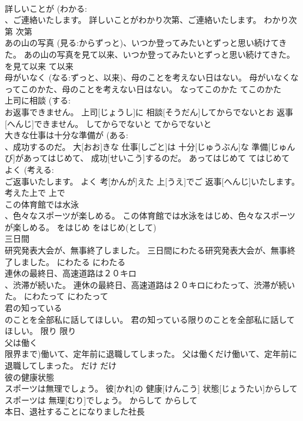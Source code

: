 \documentclass[8pt]{extreport}
\begin{document}
\begin{CJK}{UTF8}{min}
\\	詳しいことが (わかる: 
\\	、ご連絡いたします。	詳しいことがわかり次第、ご連絡いたします。	わかり次第	次第	
\\	あの山の写真 (見る:からずっと)、いつか登ってみたいとずっと思い続けてきた。	あの山の写真を見て以来、いつか登ってみたいとずっと思い続けてきた。	を見て以来	て以来	
\\	母がいなく (なる:ずっと、以来)、母のことを考えない日はない。	母がいなくなってこのかた、母のことを考えない日はない。	なってこのかた	てこのかた	
\\	上司に相談 (する: 
\\	お返事できません。	上司[じょうし]に 相談[そうだん]してからでないとお 返事[へんじ]できません。	してからでないと	てからでないと	
\\	大きな仕事は十分な準備が (ある: 
\\	、成功するのだ。	大[おお]きな 仕事[しごと]は 十分[じゅうぶん]な 準備[じゅんび]があってはじめて、 成功[せいこう]するのだ。	あってはじめて	てはじめて	
\\	よく (考える: 
\\	ご返事いたします。	よく 考[かんが]えた 上[うえ]でご 返事[へんじ]いたします。	考えた上で	上で	
\\	この体育館では水泳 
\\	、色々なスポーツが楽しめる。	この体育館では水泳をはじめ、色々なスポーツが楽しめる。	をはじめ	をはじめ(として)	
\\	三日間 
\\	研究発表大会が、無事終了しました。	三日間にわたる研究発表大会が、無事終了しました。	にわたる	にわたる	
\\	連休の最終日、高速道路は２０キロ 
\\	、渋滞が続いた。	連休の最終日、高速道路は２０キロにわたって、渋滞が続いた。	にわたって	にわたって	
\\	君の知っている 
\\	のことを全部私に話してほしい。	君の知っている限りのことを全部私に話してほしい。	限り	限り	
\\	父は働く 
\\	限界まで)働いて、定年前に退職してしまった。	父は働くだけ働いて、定年前に退職してしまった。	だけ	だけ	
\\	彼の健康状態 
\\	スポーツは無理でしょう。	彼[かれ]の 健康[けんこう] 状態[じょうたい]からしてスポーツは 無理[むり]でしょう。	からして	からして	
\\	本日、退社することになりました社長 

\end{CJK}
\end{document}
